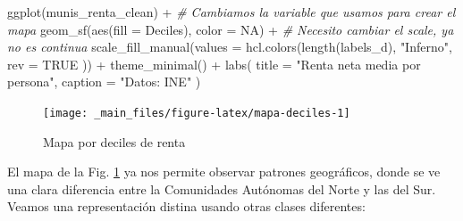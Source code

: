 \documentclass[
]{report}
\newenvironment{Shaded}{\begin{snugshade}}{\end{snugshade}}
\newcommand{\AttributeTok}[1]{\textcolor[rgb]{0.77,0.63,0.00}{#1}}
\newcommand{\CommentTok}[1]{\textcolor[rgb]{0.56,0.35,0.01}{\textit{#1}}}
\newcommand{\ConstantTok}[1]{\textcolor[rgb]{0.00,0.00,0.00}{#1}}
\newcommand{\FunctionTok}[1]{\textcolor[rgb]{0.00,0.00,0.00}{#1}}
\newcommand{\NormalTok}[1]{#1}
\newcommand{\SpecialCharTok}[1]{\textcolor[rgb]{0.00,0.00,0.00}{#1}}
\newcommand{\StringTok}[1]{\textcolor[rgb]{0.31,0.60,0.02}{#1}}
\theoremstyle{definition}
\theoremstyle{definition}
\theoremstyle{definition}
\theoremstyle{definition}
\theoremstyle{remark}
\begin{document}
\begin{Shaded}
\begin{Highlighting}[]
\FunctionTok{ggplot}\NormalTok{(munis\_renta\_clean) }\SpecialCharTok{+}
  \CommentTok{\# Cambiamos la variable que usamos para crear el mapa}
  \FunctionTok{geom\_sf}\NormalTok{(}\FunctionTok{aes}\NormalTok{(}\AttributeTok{fill =}\NormalTok{ Deciles), }\AttributeTok{color =} \ConstantTok{NA}\NormalTok{) }\SpecialCharTok{+}
  \CommentTok{\# Necesito cambiar el scale, ya no es continua}
  \FunctionTok{scale\_fill\_manual}\NormalTok{(}\AttributeTok{values =} \FunctionTok{hcl.colors}\NormalTok{(}\FunctionTok{length}\NormalTok{(labels\_d),}
    \StringTok{"Inferno"}\NormalTok{,}
    \AttributeTok{rev =} \ConstantTok{TRUE}
\NormalTok{  )) }\SpecialCharTok{+}
  \FunctionTok{theme\_minimal}\NormalTok{() }\SpecialCharTok{+}
  \FunctionTok{labs}\NormalTok{(}
    \AttributeTok{title =} \StringTok{"Renta neta media por persona"}\NormalTok{,}
    \AttributeTok{caption =} \StringTok{"Datos: INE"}
\NormalTok{  )}
\end{Highlighting}
\end{Shaded}

\begin{figure}

{\centering \texttt{[image: \_main\_files/figure-latex/mapa-deciles-1]} 

}

\caption{Mapa por deciles de renta}\label{fig:mapa-deciles}
\end{figure}

El mapa de la Fig. \ref{fig:mapa-deciles} ya nos permite observar patrones
geográficos, donde se ve una clara diferencia entre la Comunidades Autónomas del
Norte y las del Sur. Veamos una representación distina usando otras clases
diferentes:
\end{document}
